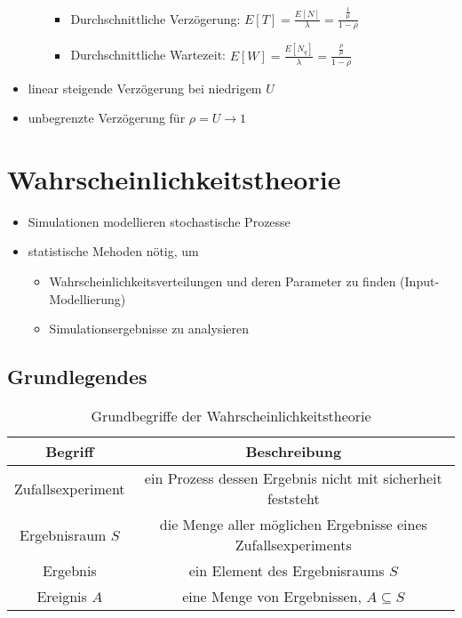 \documentclass[nonacm=true, language=german]{acmart}
\begin{document}
\begin{itemize}
\begin{itemize}
\begin{itemize}
            \item Durchschnittliche Verzögerung: $ E[T] = \frac{E[N]}{\lambda} = \frac{\frac{1}{\mu}}{1-\rho} $
            \item Durchschnittliche Wartezeit: $ E[W] = \frac{E[N_q]}{\lambda} = \frac{\frac{\rho}{\mu}}{1-\rho} $
        \end{itemize}
    \end{itemize}
    \item linear steigende Verzögerung bei niedrigem $U$
    \item unbegrenzte Verzögerung für $\rho = U \rightarrow 1$
\end{itemize}

\newpage

\section{Wahrscheinlichkeitstheorie}

\begin{itemize}
    \item Simulationen modellieren stochastische Prozesse
    \item statistische Mehoden nötig, um
    \begin{itemize}
        \item Wahrscheinlichkeitsverteilungen und deren Parameter zu finden (Input-Modellierung)
        \item Simulationsergebnisse zu analysieren
    \end{itemize}
\end{itemize}

\subsection{Grundlegendes}

\begin{table}[ht]
    \centering
    \begin{tabular}{c|c}
        \toprule
        Begriff             & Beschreibung \\
        \midrule
        Zufallsexperiment   & ein Prozess dessen Ergebnis nicht mit sicherheit feststeht \\
        Ergebnisraum $S$    & die Menge aller möglichen Ergebnisse eines Zufallsexperiments \\
        Ergebnis            & ein Element des Ergebnisraums $S$ \\
        Ereignis $A$        & eine Menge von Ergebnissen, $A \subseteq S$ \\
        \bottomrule
    \end{tabular}
    \caption{Grundbegriffe der Wahrscheinlichkeitstheorie}
    \label{tab:prob_terminology}
\end{table}
\end{document}
